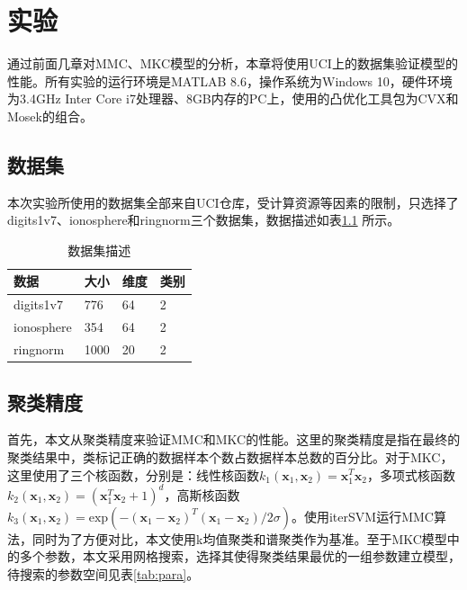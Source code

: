 \chapter{实验}
通过前面几章对MMC、MKC模型的分析，本章将使用UCI上的数据集验证模型的性能。所有实验的运行环境是MATLAB 8.6，操作系统为Windows 10，硬件环境为3.4GHz Inter Core i7处理器、8GB内存的PC上，使用的凸优化工具包为CVX和Mosek的组合。

\section{数据集}
本次实验所使用的数据集全部来自UCI仓库，受计算资源等因素的限制，只选择了digits1v7、ionosphere和ringnorm三个数据集，数据描述如表\ref{tab:dataset} 所示。
\begin{table}[!htbp]
\caption{数据集描述}
\centering
\renewcommand\arraystretch{1.5}
\begin{tabular}{|p{3cm}<{\centering}|p{2cm}<{\centering}|p{2cm}<{\centering}|p{2cm}<{\centering}|}
\hline
数据 & 大小 & 维度 & 类别 \\
\hline 
digits1v7 & 776 & 64 & 2 \\
\hline
ionosphere & 354 & 64 & 2 \\
\hline
ringnorm & 1000 & 20 & 2 \\
\hline
\end{tabular}
\label{tab:dataset}
\end{table} 

\section{聚类精度}
首先，本文从聚类精度来验证MMC和MKC的性能。这里的聚类精度是指在最终的聚类结果中，类标记正确的数据样本个数占数据样本总数的百分比。对于MKC，这里使用了三个核函数，分别是：线性核函数$k_1(\mathbf{x}_1,\mathbf{x}_2)=\mathbf{x}_1^T\mathbf{x}_2$，多项式核函数$k_2(\mathbf{x}_1,\mathbf{x}_2)=(\mathbf{x}_1^T\mathbf{x}_2+1)^d$，高斯核函数$k_3(\mathbf{x}_1,\mathbf{x}_2)=\mathrm{exp}(-(\mathbf{x}_1-\mathbf{x}_2)^T(\mathbf{x}_1-\mathbf{x}_2)/2\sigma)$。使用iterSVM运行MMC算法，同时为了方便对比，本文使用k均值聚类和谱聚类作为基准。至于MKC模型中的多个参数，本文采用网格搜索，选择其使得聚类结果最优的一组参数建立模型，待搜索的参数空间见表\ref{tab:para}。

